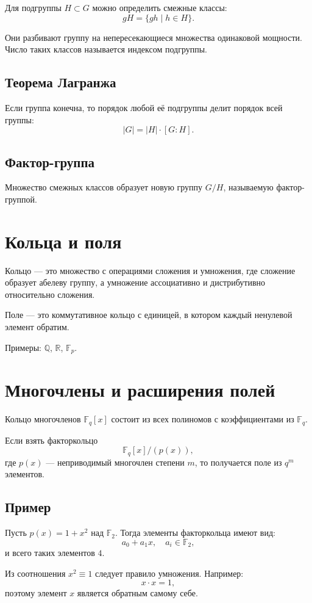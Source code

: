 \documentclass[a4paper,12pt]{article}
\begin{document}
Для подгруппы $H \subset G$ можно определить смежные классы:
\[
gH = \{gh \mid h \in H\}.
\]

Они разбивают группу на непересекающиеся множества одинаковой мощности. Число таких классов называется индексом подгруппы.

\subsection{Теорема Лагранжа}

Если группа конечна, то порядок любой её подгруппы делит порядок всей группы:
\[
|G| = |H| \cdot [G : H].
\]

\subsection{Фактор-группа}

Множество смежных классов образует новую группу $G/H$, называемую фактор-группой.

\section{Кольца и поля}

Кольцо — это множество с операциями сложения и умножения, где сложение образует абелеву группу, а умножение ассоциативно и дистрибутивно относительно сложения.

Поле — это коммутативное кольцо с единицей, в котором каждый ненулевой элемент обратим.

Примеры: $\mathbb{Q}$, $\mathbb{R}$, $\mathbb{F}_p$.

\section{Многочлены и расширения полей}

Кольцо многочленов $\mathbb{F}_q[x]$ состоит из всех полиномов с коэффициентами из $\mathbb{F}_q$.

Если взять факторкольцо
\[
\mathbb{F}_q[x]/(p(x)),
\]
где $p(x)$ — неприводимый многочлен степени $m$, то получается поле из $q^m$ элементов.

\subsection{Пример}

Пусть $p(x) = 1 + x^2$ над $\mathbb{F}_2$. Тогда элементы факторкольца имеют вид:
\[
a_0 + a_1 x, \quad a_i \in \mathbb{F}_2,
\]
и всего таких элементов $4$.

Из соотношения $x^2 \equiv 1$ следует правило умножения. Например:
\[
x \cdot x = 1,
\]
поэтому элемент $x$ является обратным самому себе.
\end{document}
